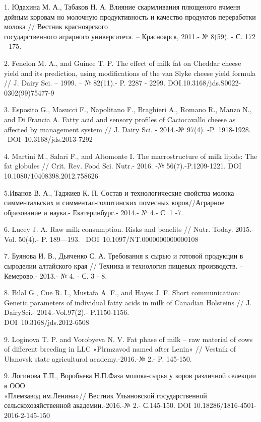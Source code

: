 \begin{noparindent}

1. Юдахина М. А., Табаков Н. А. Влияние скармливания плющеного ячменя
дойным коровам но молочную продуктивность и качество продуктов
переработки молока // Вестник красноярского \\государственного аграрного
университета. -- Красноярск, 2011.- № 8(59). - С. 172 - 175.

2. Fenelon M. A., and Guinee T. P. The effect of milk fat on Cheddar
cheese yield and its prediction, using modifications of the van Slyke
cheese yield formula // J. Dairy Sci. -- 1999. -- № 82(11).- P. 2287 -
2299. DOI.10.3168/jds.S0022-0302(99)75477-9

3. Esposito G., Masucci F., Napolitano F., Braghieri A., Romano R.,
Manzo N., and Di Francia A. Fatty acid and sensory profiles of
Caciocavallo cheese as affected by management system // J. Dairy Sci. -
2014.-№ 97(4). -P. 1918-1928. ~DOI~10.3168/jds.2013-7292

4. Martini M., Salari F., and Altomonte I. The macrostructure of milk
lipids: The fat globules // Crit. Rev. Food Sci. Nutr.- 2016. -№
56(7).-P.1209-1221. DOI 10.1080/10408398.2012.758626

5.Иванов В. А., Таджиев К. П. Состав и технологические свойства молока
симментальских и симментал-голштинских помесных коров//Аграрное
образование и наука.- Екатеринбург.- 2014.- № 4.- С. 1 -7.

6. Lucey J. A. Raw milk consumption. Risks and benefits // Nutr. Today.
2015.-Vol. 50(4).- P. 189---193. ~DOI~10.1097/NT.0000000000000108

7. Буянова И. В., Дьяченко С. А. Требования к сырью и готовой продукции
в сыроделии алтайского края // Техника и технология пищевых производств.
--Кемерово.- 2013.- № 4. - С. 3 - 8.

8. Bilal G., Cue R. I., Mustafa A. F., and Hayes J. F. Short
communication: Genetic parameters of individual fatty acids in milk of
Canadian Holsteins // J. DairySci.- 2014.-Vol.97(2).- P.1150-1156.
\\DOI~10.3168/jds.2012-6508

9. Loginova T. P. and Vorobyeva N. V. Fat phase of milk -- raw material
of cows of different breeding in LLC «Plrmzavod named after Lenin» //
Vestnik of Ulanovsk state agricultural academy.-2016.-№ 2.- P. 145-150.

9. Логинова Т.П., Воробьева Н.П.Фаза молока-сырья у коров различной
селекции в ООО \\«Племзавод им.Ленина»// Вестник Ульяновской
государственной сельскохозяйственной академии.-2016.-№ 2.- С.145-150.
DOI 10.18286/1816-4501-2016-2-145-150


\end{noparindent}
